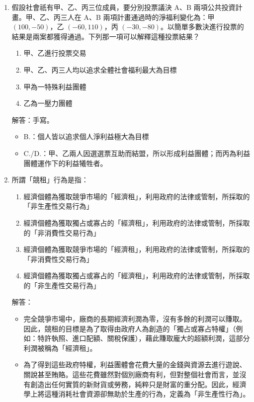 \documentclass[12pt, a4paper]{article}
\begin{document}
\begin{enumerate}
    \item 假設社會祇有甲、乙、丙三位成員，要分別投票議決 A、B 兩項公共投資計畫。甲、乙、丙三人在 A、B 兩項計畫通過時的淨福利變化為：甲 \((100, -50)\)，乙 \((-60, 110)\)，丙 \((-30, -80)\)。以簡單多數決進行投票的結果是兩案都獲得通過。下列那一項可以解釋這種投票結果？
    \begin{enumerate}[label=\Alph*.]
        \item 甲、乙進行投票交易
        \item 甲、乙、丙三人均以追求全體社會福利最大為目標
        \item 甲為一特殊利益團體
        \item 乙為一壓力團體
    \end{enumerate}
    解答：手寫。
    \begin{itemize}
        \item B.：個人皆以追求個人淨利益極大為目標
        \item C./D.：甲、乙兩人因選選票互助而結盟，所以形成利益團體；而丙為利益團體運作下的利益犧牲者。
    \end{itemize}

    \item 所謂「競租」行為是指：
    \begin{enumerate}[label=\Alph*.]
        \item 經濟個體為獲取競爭市場的「經濟租」，利用政府的法律或管制，所採取的「非生產性交易行為」
        \item 經濟個體為獲取獨占或寡占的「經濟租」，利用政府的法律或管制，所採取的「非消費性交易行為」
        \item 經濟個體為獲取競爭市場的「經濟租」，利用政府的法律或管制，所採取的「非消費性交易行為」
        \item 經濟個體為獲取獨占或寡占的「經濟租」，利用政府的法律或管制，所採取的「非生產性交易行為」
    \end{enumerate}
    解答：
    \begin{itemize}
        \item 完全競爭市場中，廠商的長期經濟利潤為零，沒有多餘的利潤可以賺取。因此，競租的目標是為了取得由政府人為創造的「獨占或寡占特權」（例如：特許執照、進口配額、關稅保護），藉此賺取龐大的超額利潤，這部分利潤被稱為「經濟租」。
        \item 為了得到這些政府特權，利益團體會花費大量的金錢與資源去進行遊說、關說甚至賄賂。這些花費雖然對個別廠商有利，但對整個社會而言，並沒有創造出任何實質的新財貨或勞務，純粹只是財富的重分配。因此，經濟學上將這種消耗社會資源卻無助於生產的行為，定義為「非生產性行為」。
    \end{itemize}


\end{enumerate}
\end{document}
